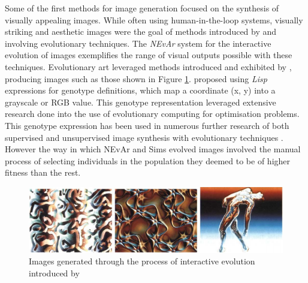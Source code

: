 \documentclass{article}
\begin{document}
Some of the first methods for image generation focused on the synthesis of visually appealing images.
While often using human-in-the-loop systems, visually striking and aesthetic images were the goal of methods introduced by \citet{sims} and \citet{nevar} involving evolutionary techniques.
The \textit{NEvAr} \citep{nevar} system for the interactive evolution of images exemplifies the range of visual outputs possible with these techniques.
Evolutionary art leveraged methods introduced and exhibited by \citet{sims}, producing images such as those shown in Figure \ref{fig:sims}.
\citet{sims} proposed using \textit{Lisp} expressions for genotype definitions, which map a coordinate (x, y) into a grayscale or RGB value.
This genotype representation leveraged extensive research done into the use of evolutionary computing for optimisation problems.
This genotype expression has been used in numerous further research of both supervised and unsupervised image synthesis with evolutionary techniques \citep{nevar,sims,den2011evolving,distributed-evolutionary-art,aesthetic-measures}.
However the way in which NEvAr and Sims evolved images involved the manual process of selecting individuals in the population they deemed to be of higher fitness than the rest.

\begin{figure}[h!]
	\includegraphics[width=\textwidth]{images/sims-interactive-image-generation.png}
	\caption{Images generated through the process of interactive evolution introduced by \citet{sims}}
	\label{fig:sims}
\end{figure}
\end{document}
